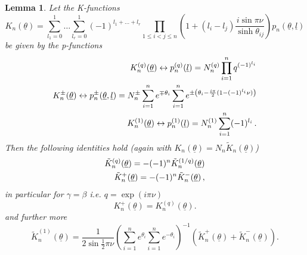 \documentclass[a4paper,a4paper]{article}
\newtheorem{lemma}[theorem]{Lemma}
\begin{document}
\begin{lemma}
\label{l2}Let the K-functions 
\[
K_{n}(\underline{\theta })=\sum_{l_{1}=0}^{1}\dots
\sum_{l_{r}=0}^{1}(-1)^{l_{1}+\dots +l_{r}}\prod_{1\leq i<j\leq n}\left(
1+(l_{i}-l_{j})\frac{i\sin \pi \nu }{\sinh \theta _{ij}}\right) p_{n}(%
\underline{\theta },\underline{l}) 
\]
be given by the p-functions 
\begin{eqnarray*}
K_{n}^{(q)}(\underline{\theta })\leftrightarrow p_{n}^{(q)}(\underline{l}%
)=N_{n}^{(q)}\prod\limits_{i=1}^{n}q^{(-1)^{l_{i}}} \\
K_{n}^{\pm }(\underline{\theta })\leftrightarrow p_{n}^{\pm }(\underline{%
\theta },\underline{l})=N_{n}^{\pm }\sum\limits_{i=1}^{n}e^{\mp \theta
_{i}}\sum\limits_{i=1}^{n}e^{\pm \left( \theta _{i}-\frac{i\pi }{2}%
(1-(-1)^{l_{i}}\nu )\right) } \\
K_{n}^{(1)}(\underline{\theta })\leftrightarrow p_{n}^{(1)}(\underline{l}%
)=N_{n}^{(1)}\sum\limits_{i=1}^{n}(-1)^{l_{i}}\,.
\end{eqnarray*}
Then the following identities hold (again with $K_{n}(\underline{\theta }%
)=N_{n}\tilde{K}_{n}(\underline{\theta })$) 
\begin{eqnarray}
\tilde{K}_{n}^{(q)}(\underline{\theta })=-(-1)^{n}\tilde{K}_{n}^{(1/q)}(%
\underline{\theta })  \nonumber \\
\tilde{K}_{n}^{+}(\underline{\theta })=-(-1)^{n}\tilde{K}_{n}^{-}(\underline{%
\theta })\,,  \label{4.5}
\end{eqnarray}
in particular for $\gamma =\beta $ i.e. $q=\exp (i\pi \nu )$%
\[
K_{n}^{+}(\underline{\theta })=K_{n}^{(q)}(\underline{\theta }). 
\]
and further more 
\begin{equation}
\tilde{K}_{n}^{(1)}(\underline{\theta })=\frac{1}{2\sin \frac{1}{2}\pi \nu }%
\left( \sum_{i=1}^{n}e^{\theta _{i}}\sum_{i=1}^{n}e^{-\theta _{i}}\right)
^{-1}\left( \tilde{K}_{n}^{+}(\underline{\theta })+\tilde{K}_{n}^{-}(%
\underline{\theta })\right) .  \label{4.6}
\end{equation}
\end{lemma}
\end{document}

